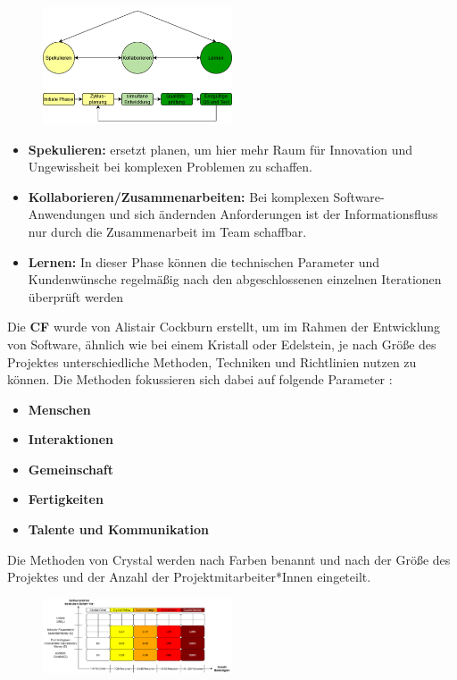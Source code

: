 \begin{figure}[h!]
\centering
    \includegraphics[width=0.5\textwidth]{fig/ASD.png}
    \label{fig:ASD-diagram}
\end{figure}
\begin{itemize}
    \item \textbf{Spekulieren:} ersetzt planen, um hier mehr Raum für Innovation und Ungewissheit bei komplexen Problemen zu schaffen.
    \item \textbf{Kollaborieren/Zusammenarbeiten:} Bei komplexen Software-Anwendungen und sich ändernden Anforderungen ist der Informationsfluss nur durch die Zusammenarbeit im Team schaffbar.
    \item \textbf{Lernen:} In dieser Phase können die technischen Parameter und Kundenwünsche regelmäßig nach den abgeschlossenen einzelnen Iterationen überprüft werden
\end{itemize}
\cite{Alnoukari2008-ro,Abdelaziz2015-lb}
\newline
Die \textbf{CF} wurde von Alistair Cockburn erstellt, um im Rahmen der Entwicklung von Software, ähnlich wie bei einem Kristall oder Edelstein, 
je nach Größe des Projektes unterschiedliche Methoden, Techniken und Richtlinien nutzen zu können. Die Methoden fokussieren sich 
dabei auf folgende Parameter \cite{Ibrahim2020-ip}:
\begin{itemize}
    \item \textbf{Menschen}
    \item \textbf{Interaktionen} 
    \item \textbf{Gemeinschaft}    
    \item \textbf{Fertigkeiten}
    \item \textbf{Talente und Kommunikation }
\end{itemize}
Die Methoden von Crystal werden nach Farben benannt und nach der Größe des Projektes und der Anzahl der Projektmitarbeiter*Innen eingeteilt.
\begin{figure}
    \centering
        \includegraphics[width=0.5\textwidth]{fig/CSD.png}
        \label{fig:CS-diagram}
    \end{figure}
